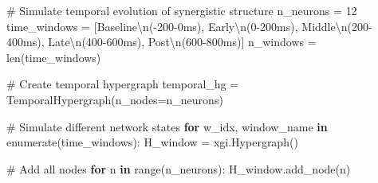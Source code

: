 \documentclass[
  11pt,
  letterpaper,
  oneside,
  openany]{book}
\newenvironment{Shaded}{\begin{snugshade}}{\end{snugshade}}
\newcommand{\BuiltInTok}[1]{\textcolor[rgb]{0.00,0.23,0.31}{#1}}
\newcommand{\CharTok}[1]{\textcolor[rgb]{0.13,0.47,0.30}{#1}}
\newcommand{\CommentTok}[1]{\textcolor[rgb]{0.37,0.37,0.37}{#1}}
\newcommand{\ControlFlowTok}[1]{\textcolor[rgb]{0.00,0.23,0.31}{\textbf{#1}}}
\newcommand{\DecValTok}[1]{\textcolor[rgb]{0.68,0.00,0.00}{#1}}
\newcommand{\KeywordTok}[1]{\textcolor[rgb]{0.00,0.23,0.31}{\textbf{#1}}}
\newcommand{\NormalTok}[1]{\textcolor[rgb]{0.00,0.23,0.31}{#1}}
\newcommand{\OperatorTok}[1]{\textcolor[rgb]{0.37,0.37,0.37}{#1}}
\newcommand{\StringTok}[1]{\textcolor[rgb]{0.13,0.47,0.30}{#1}}
\begin{document}
\begin{Shaded}
\begin{Highlighting}[]
\CommentTok{\# Simulate temporal evolution of synergistic structure}
\NormalTok{n\_neurons }\OperatorTok{=} \DecValTok{12}
\NormalTok{time\_windows }\OperatorTok{=}\NormalTok{ [}\StringTok{\textquotesingle{}Baseline}\CharTok{\textbackslash{}n}\StringTok{({-}200{-}0ms)\textquotesingle{}}\NormalTok{, }\StringTok{\textquotesingle{}Early}\CharTok{\textbackslash{}n}\StringTok{(0{-}200ms)\textquotesingle{}}\NormalTok{, }
                \StringTok{\textquotesingle{}Middle}\CharTok{\textbackslash{}n}\StringTok{(200{-}400ms)\textquotesingle{}}\NormalTok{, }\StringTok{\textquotesingle{}Late}\CharTok{\textbackslash{}n}\StringTok{(400{-}600ms)\textquotesingle{}}\NormalTok{, }\StringTok{\textquotesingle{}Post}\CharTok{\textbackslash{}n}\StringTok{(600{-}800ms)\textquotesingle{}}\NormalTok{]}
\NormalTok{n\_windows }\OperatorTok{=} \BuiltInTok{len}\NormalTok{(time\_windows)}

\CommentTok{\# Create temporal hypergraph}
\NormalTok{temporal\_hg }\OperatorTok{=}\NormalTok{ TemporalHypergraph(n\_nodes}\OperatorTok{=}\NormalTok{n\_neurons)}

\CommentTok{\# Simulate different network states}
\ControlFlowTok{for}\NormalTok{ w\_idx, window\_name }\KeywordTok{in} \BuiltInTok{enumerate}\NormalTok{(time\_windows):}
\NormalTok{    H\_window }\OperatorTok{=}\NormalTok{ xgi.Hypergraph()}
    
    \CommentTok{\# Add all nodes}
    \ControlFlowTok{for}\NormalTok{ n }\KeywordTok{in} \BuiltInTok{range}\NormalTok{(n\_neurons):}
\NormalTok{        H\_window.add\_node(n)}
    

\end{Highlighting}
\end{Shaded}
\end{document}
